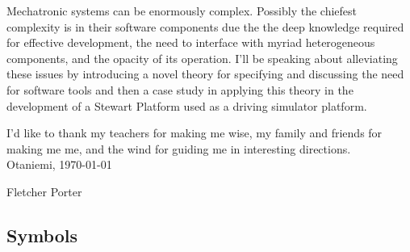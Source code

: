 \documentclass[english,12pt,a4paper,pdftex,eng,utf8]{aaltothesis}
\begin{document}

\begin{abstractpage}[english]
Mechatronic systems can be enormously complex.  Possibly the chiefest complexity is in their software components due the the deep knowledge required for effective development, the need to interface with myriad heterogeneous components, and the opacity of its operation.  I'll be speaking about alleviating these issues by introducing a novel theory for specifying and discussing the need for software tools and then a case study in applying this theory in the development of a Stewart Platform used as a driving simulator platform. 
\end{abstractpage}

\newpage

I'd like to thank my teachers for making me wise, my family and friends for making me me, and the wind for guiding me in interesting directions. \\

\vspace{5cm}
Otaniemi, \today

\vspace{5mm}
{\hfill Fletcher Porter \hspace{1cm}}

\newpage


\thesistableofcontents



\subsection*{Symbols}
\end{document}
